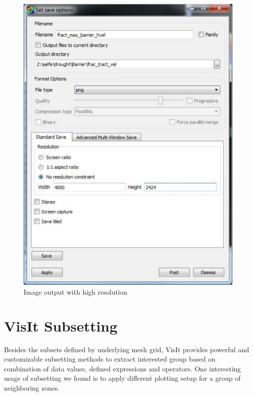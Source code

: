 \documentclass[12pt]{report}
\begin{document}
\begin{figure}
\begin{center}
\includegraphics{highQualityImageSet}
\caption{Image output with high resolution }
\label{figure:highQualityImageSet}
\end{center}
\end{figure} 			

\section{VisIt Subsetting}

Besides the subsets defined by underlying mesh grid, VisIt provides powerful and customizable subsetting methods
to extract interested group based on combination of data values, defined expressions and operators. One interesting
usage of subsetting we found is to apply different plotting setup for a group of neighboring zones. 
\end{document}
